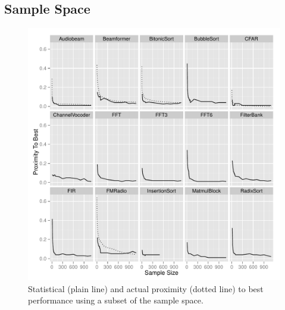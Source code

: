 \subsection{Sample Space}

\begin{figure}[h]
  \centering
    \includegraphics[width=1\textwidth]{streamit-paper/graphics/ESCProx.pdf}
    \caption{Statistical (plain line) and actual proximity (dotted line) to best performance using a subset of the sample space.}\label{fig:prox}
\end{figure}

